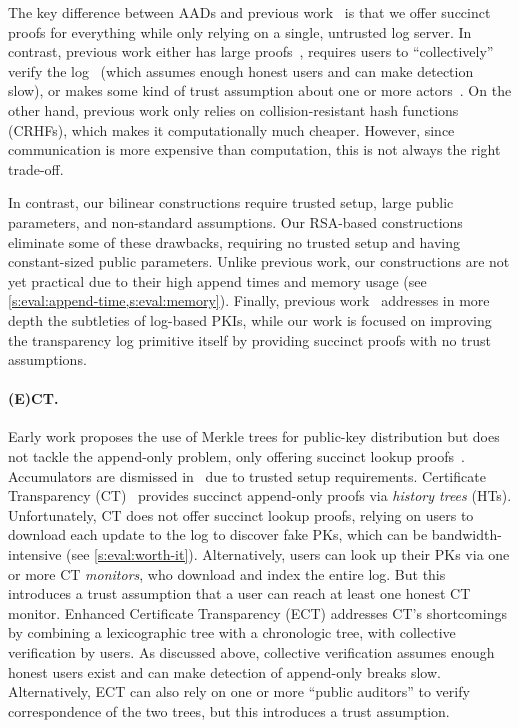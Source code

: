 The key difference between AADs and previous work~\cite{BuldasLaudLipmaa2000,ct,Ryan2014,aki,arpki,policert,coniks,dtki} is that we offer succinct proofs for everything while only relying on a single, untrusted log server.
In contrast, previous work either has large proofs~\cite{ct,coniks}, requires users to ``collectively'' verify the log~\cite{Ryan2014,dtki} (which assumes enough honest users and can make detection slow), or makes some kind of trust assumption about one or more actors~\cite{ct,aki,arpki,policert}.
On the other hand, previous work only relies on collision-resistant hash functions (CRHFs), which makes it computationally much cheaper.
However, since communication is more expensive than computation, this is not always the right trade-off.

In contrast, our bilinear constructions require trusted setup, large public parameters, and non-standard assumptions.
Our RSA-based constructions eliminate some of these drawbacks, requiring no trusted setup and having constant-sized public parameters.
Unlike previous work, our constructions are not yet practical due to their high append times and memory usage (see \cref{s:eval:append-time,s:eval:memory}).
Finally, previous work~\cite{aki,arpki,dtki,policert} addresses in more depth the subtleties of log-based PKIs, while our work is focused on improving the transparency log primitive itself by providing succinct proofs with no trust assumptions.

\paragraph{(E)CT.}
Early work proposes the use of Merkle trees for public-key distribution but does not tackle the append-only problem, only offering succinct lookup proofs~\cite{crt,certificate-rev-upd,BuldasLaudLipmaa2000}.
Accumulators are dismissed in~\cite{BuldasLaudLipmaa2000} due to trusted setup requirements.
Certificate Transparency (CT)~\cite{ct} provides succinct append-only proofs via \textit{history trees} (HTs).
Unfortunately, CT does not offer succinct lookup proofs, relying on users to download each update to the log to discover fake PKs, which can be bandwidth-intensive (see \cref{s:eval:worth-it}).
Alternatively, users can look up their PKs via one or more CT \textit{monitors}, who download and index the entire log.
But this introduces a trust assumption that a user can reach at least one honest CT monitor.
Enhanced Certificate Transparency (ECT) addresses CT's shortcomings by combining a lexicographic tree with a chronologic tree, with collective verification by users.
As discussed above, collective verification assumes enough honest users exist and can make detection of append-only breaks slow.
Alternatively, ECT can also rely on one or more ``public auditors'' to verify correspondence of the two trees, but this introduces a trust assumption.

